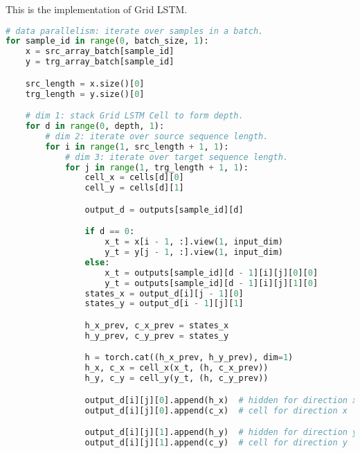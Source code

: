 This is the implementation of Grid LSTM.

\begin{lstlisting}[language=Python]
# data parallelism: iterate over samples in a batch.
for sample_id in range(0, batch_size, 1):
    x = src_array_batch[sample_id]
    y = trg_array_batch[sample_id]

    src_length = x.size()[0]
    trg_length = y.size()[0]

    # dim 1: stack Grid LSTM Cell to form depth.
    for d in range(0, depth, 1):
        # dim 2: iterate over source sequence length.
        for i in range(1, src_length + 1, 1):
            # dim 3: iterate over target sequence length.
            for j in range(1, trg_length + 1, 1):
                cell_x = cells[d][0]
                cell_y = cells[d][1]

                output_d = outputs[sample_id][d]

                if d == 0:
                    x_t = x[i - 1, :].view(1, input_dim)
                    y_t = y[j - 1, :].view(1, input_dim)
                else:
                    x_t = outputs[sample_id][d - 1][i][j][0][0]
                    y_t = outputs[sample_id][d - 1][i][j][1][0]
                states_x = output_d[i][j - 1][0]
                states_y = output_d[i - 1][j][1]

                h_x_prev, c_x_prev = states_x
                h_y_prev, c_y_prev = states_y

                h = torch.cat((h_x_prev, h_y_prev), dim=1)
                h_x, c_x = cell_x(x_t, (h, c_x_prev))
                h_y, c_y = cell_y(y_t, (h, c_y_prev))

                output_d[i][j][0].append(h_x)  # hidden for direction x
                output_d[i][j][0].append(c_x)  # cell for direction x

                output_d[i][j][1].append(h_y)  # hidden for direction y
                output_d[i][j][1].append(c_y)  # cell for direction y

\end{lstlisting}
